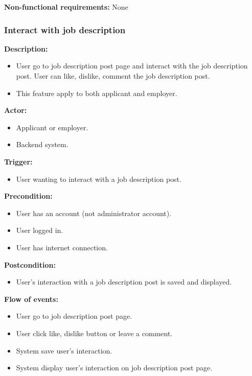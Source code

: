 \documentclass[a4paper]{article}
\begin{document}
\textbf{Non-functional requirements:}
None

\subsubsection{Interact with job description}
\textbf{Description:}
\begin{itemize}
    \item User go to job description post page and interact with the job description post. User can like, dislike, comment the job description post.
    \item This feature apply to both applicant and employer.
\end{itemize}

\textbf{Actor:}
\begin{itemize}
    \item Applicant or employer.
    \item Backend system.
\end{itemize}

\textbf{Trigger:}
\begin{itemize}
    \item User wanting to interact with a job description post.
\end{itemize}

\textbf{Precondition:}
\begin{itemize}
    \item User has an account (not administrator account).
    \item User logged in.
    \item User has internet connection.
\end{itemize}

\textbf{Postcondition:}
\begin{itemize}
    \item User's interaction with a job description post is saved and displayed.
\end{itemize}

\textbf{Flow of events:}
\begin{itemize}
    \item User go to job description post page.
    \item User click like, dislike button or leave a comment.
    \item System save user's interaction.
    \item System display user's interaction on job description post page.
\end{itemize}
\end{document}
